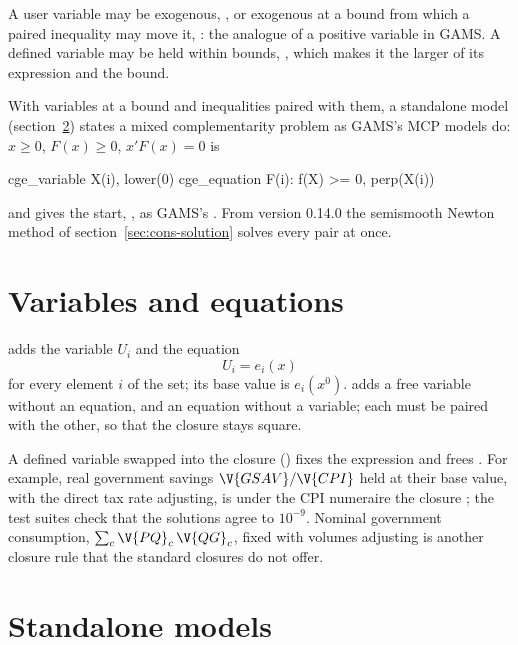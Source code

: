 A user variable may be exogenous, , or
exogenous at a bound from which a paired inequality may move it,
: the analogue of a positive variable in
GAMS. A defined variable may be held within bounds,
, which makes it the
larger of its expression and the bound.

With variables at a bound and inequalities paired with them, a standalone
model (section~\ref{sec:standalone}) states a mixed complementarity problem
as GAMS's MCP models do: $x \ge 0$, $F(x) \ge 0$, $x'F(x) = 0$ is
\begin{stcode}
cge_variable X(i), lower(0)
cge_equation F(i): f(X) >= 0, perp(X(i))
\end{stcode}
and  gives the start, , as
GAMS's . From version 0.14.0 the semismooth Newton method of
section~\ref{sec:cons-solution} solves every pair at once.

\section{Variables and equations}

 adds the variable $U_i$ and the
equation
\begin{equation*}
U_i = e_i(x)
\end{equation*}
for every element $i$ of the set; its base value is $e_i(x^0)$.
 adds a free variable without an equation,
and  an equation without a variable; each
must be paired with the other, so that the closure stays square.

A defined variable swapped into the closure ()
fixes the expression and frees . For example, real government savings
$\V{GSAV}/\V{CPI}$ held at their base value, with the direct tax rate
adjusting, is under the CPI numeraire the closure ; the test
suites check that the solutions agree to $10^{-9}$. Nominal government
consumption, $\sum_c \V{PQ}_c\,\V{QG}_c$, fixed with volumes adjusting is
another closure rule that the standard closures do not offer.

\section{Standalone models}\label{sec:standalone}

